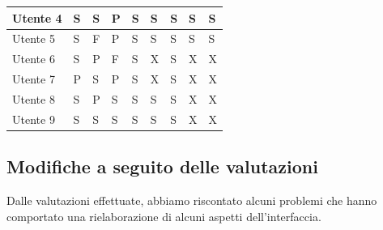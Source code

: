 \begin{table}[ht]
{\begin{tabular}{l|l|l|l|l|l|l|l|l|}
                \multicolumn{1}{|l|}{Utente 4} & S & S & P & S & S & S & S & S \\ \hline
                \multicolumn{1}{|l|}{Utente 5} & S & F & P & S & S & S & S & S \\ \hline
                \multicolumn{1}{|l|}{Utente 6} & S & P & F & S & X & S & X & X \\ \hline %
                \multicolumn{1}{|l|}{Utente 7} & P & S & P & S & X & S & X & X \\ \hline %
                \multicolumn{1}{|l|}{Utente 8} & S & P & S & S & S & S & X & X \\ \hline %
                \multicolumn{1}{|l|}{Utente 9} & S & S & S & S & S & S & X & X \\ \hline %
                \end{tabular}
                }
            \end{table}

        \newpage
        
        \subsection{Modifiche a seguito delle valutazioni}
            Dalle valutazioni effettuate, abbiamo riscontato alcuni problemi che hanno comportato una rielaborazione di alcuni aspetti dell’interfaccia. \\[1\baselineskip]

